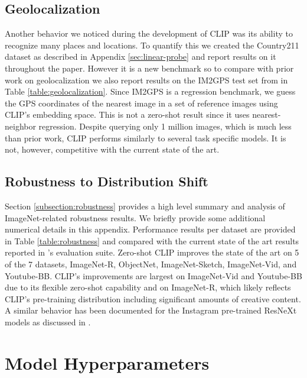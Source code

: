 \documentclass{article}
\begin{document}
\subsection{Geolocalization}

Another behavior we noticed during the development of CLIP was its ability to recognize many places and locations. To quantify this we created the Country211 dataset as described in Appendix \ref{sec:linear-probe} and report results on it throughout the paper. However it is a new benchmark so to compare with prior work on geolocalization we also report results on the IM2GPS test set from \citet{hays2008im2gps} in Table \ref{table:geolocalization}. Since IM2GPS is a regression benchmark, we guess the GPS coordinates of the nearest image in a set of reference images using CLIP's embedding space. This is not a zero-shot result since it uses nearest-neighbor regression. Despite querying only 1 million images, which is much less than prior work, CLIP performs similarly to several task specific models. It is not, however, competitive with the current state of the art.

\subsection{Robustness to Distribution Shift}

Section \ref{subsection:robustness} provides a high level summary and analysis of ImageNet-related robustness results. We briefly provide some additional numerical details in this appendix. Performance results per dataset are provided in Table \ref{table:robustness} and compared with the current state of the art results reported in \citet{taori2020measuring}'s evaluation suite. Zero-shot CLIP improves the state of the art on 5 of the 7 datasets, ImageNet-R, ObjectNet, ImageNet-Sketch, ImageNet-Vid, and Youtube-BB. CLIP's improvements are largest on ImageNet-Vid and Youtube-BB due to its flexible zero-shot capability and on ImageNet-R, which likely reflects CLIP's pre-training distribution including significant amounts of creative content. A similar behavior has been documented for the Instagram pre-trained ResNeXt models as discussed in \citet{taori2020measuring}.



\clearpage

\section{Model Hyperparameters}
\end{document}
